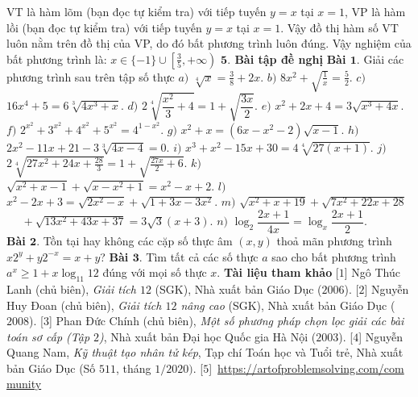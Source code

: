 \begin{multicols}{2}
	VT là hàm lõm (bạn đọc tự kiểm tra) với tiếp tuyến $y=x$ tại $x=1$, VP là hàm lồi (bạn đọc tự kiểm tra) với tiếp tuyến $y=x$ tại $x=1$. Vậy đồ thị hàm số VT luôn nằm trên đồ thị của VP,  do đó bất phương trình luôn đúng.
	\vskip 0.1cm
	Vậy nghiệm của bất phương trình là: \linebreak $x\in\{-1\}\cup\left[\frac 35,+\infty\right)$
	\vskip 0.1cm
	\textbf{\color{diendantoanhoc}$\pmb{5.}$ Bài tập đề nghị}
	\vskip 0.1cm
	\textbf{\color{diendantoanhoc}Bài $\pmb{1.}$} Giải các phương trình sau trên tập số thực
	\vskip 0.1cm
	$a)$  $\sqrt[4]{x}=\frac{3}{8}+2x$.
	\vskip 0.1cm
	$b)$ $8x^2+\sqrt{\frac{1}{x}}=\frac{5}{2}.$
	\vskip 0.1cm
	$c)$ $16x^4+5=6\sqrt[3]{4x^3+x}.$
	\vskip 0.1cm
	$d)$ $ 2\sqrt[4]{\dfrac{x^{2}}{3}+4}=1+\sqrt{\dfrac{3x}{2}}.$
	\vskip 0.1cm
	$e)$ $x^2+2x+4=3\sqrt{x^3+4x}.$
	\vskip 0.1cm
	$f)$ $2^{x^2}+3^{x^2}+4^{x^2}+5^{x^2}=4^{1-x^2}.$
	\vskip 0.1cm
	$g)$ $x^2+x = (6x-x^2-2)\sqrt{x-1}.$
	\vskip 0.1cm
	$h)$ $2x^2-11x+21-3\sqrt[3]{4x-4}=0.$
	\vskip 0.1cm
	$i)$ $x^{3}+x^{2}-15x+30=4\sqrt[4]{27(x+1)}.$
	\vskip 0.1cm
	$j)$ $2\sqrt[4]{27x^2+24x+\frac{28}{3}}=1+\sqrt{\frac{27x}{2}+6}.$
	\vskip 0.1cm
	$k)$ $\sqrt{x^2+x-1}+\sqrt{x-x^2+1}=x^2-x+2.$
	\vskip 0.1cm
	$l)$ $x^2-2x+3=\sqrt{2x^2-x}+\sqrt{1+3x-3x^2}.$
	\vskip 0.1cm
	$m)$ $\sqrt{x^2+x+19}+\sqrt{7x^2+22x+28}$\\
	$\quad\,\,+\sqrt{13x^2+43x+37}=3\sqrt{3}(x+3)$.
	\vskip 0.1cm
	$n)$ $\log_2 \dfrac{2x+1}{4x} = \log_{x} \dfrac{2x+1}{2}.$\\
	\vskip 0.1cm
	\textbf{\color{diendantoanhoc}Bài $\pmb{2.}$} Tồn tại hay không các cặp số thực âm $(x,y)$ thoả mãn phương trình \linebreak$x2^y+y2^{-x}=x+y$?
	\vskip 0.1cm
	\textbf{\color{diendantoanhoc}Bài $\pmb{3.}$} Tìm tất cả các số thực $a$ sao cho bất phương trình $a^x\geq 1+x\log _{11}12$ đúng với mọi số thực $x$.
	\vskip 0.1cm
	\textbf{\color{diendantoanhoc}Tài liệu tham khảo}
	\vskip 0.1cm
	[$1$] Ngô Thúc Lanh (chủ biên), {\it Giải tích $12$ }(SGK), Nhà xuất bản Giáo Dục ($2006$).
	\vskip 0.1cm
	[$2$] Nguyễn Huy Đoan (chủ biên), {\it Giải tích $12$ nâng cao} (SGK), Nhà xuất bản Giáo Dục ($2008$).
	\vskip 0.1cm
	[$3$] Phan Đức Chính (chủ biên), {\it Một số phương pháp chọn lọc giải các bài toán sơ cấp (Tập $2$)}, Nhà xuất bản Đại học Quốc gia Hà Nội ($2003$). 
	\vskip 0.1cm
	[$4$] Nguyễn Quang Nam, {\it Kỹ thuật tạo nhân tử kép}, Tạp chí Toán học và Tuổi trẻ, Nhà xuất bản Giáo Dục (Số $511$, tháng $1/2020)$.
	\vskip 0.1cm
	[$5$]~\url{https://artofproblemsolving.com/com} \url{munity}
	\end{multicols}
